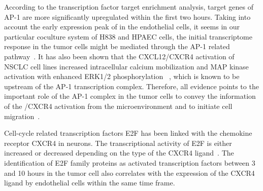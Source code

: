 \begin{itemize}
According to the transcription factor target enrichment analysis, target genes
of AP-1 are more significantly upregulated within the first two hours. 
Taking into account
the early expression peak of \tnfa in the endothelial cells, it seems
in our particular coculture system of H838 and HPAEC cells, the initial 
transcriptome response in the tumor cells might be mediated through the AP-1
related pathway~\citep{Kulbe2005}. It has also been
shown that the CXCL12/CXCR4 activation of NSCLC cell lines 
increased intracellular calcium mobilization and MAP kinase 
activation with enhanced ERK1/2 phosphorylation~%
\citep{Belperio2004}, which is 
known to be upstream of the AP-1 transcription complex.
Therefore, all evidence points to the important role of the
AP-1 complex in the tumor cells to convey the information of  
the \sdfonea/CXCR4 activation from the microenvironment and to initiate cell
migration~\citep{Busch2008,Singh2012}.

Cell-cycle related transcription factors E2F has been linked with the chemokine
receptor CXCR4 in neurons. The transcriptional activity of E2F is either 
increased or decreased depending on the type of the CXCR4 ligand~\citep{Khan2003}.
The identification of E2F family proteins as activated transcription factors 
between 3 and 10 hours in the tumor cell also correlates with the expression of 
the CXCR4 ligand \sdfonea by endothelial cells within the same time frame.


\end{itemize}








